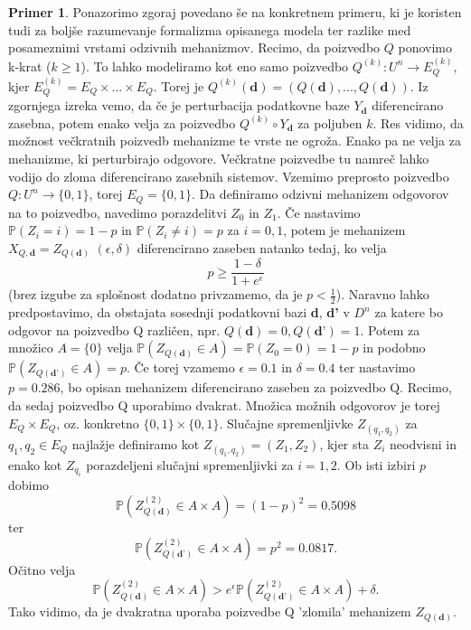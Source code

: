\documentclass[12pt,a4paper]{amsart}
\theoremstyle{definition} %
\newtheorem{primer}[definicija]{Primer}
\theoremstyle{plain} %
\begin{document}
\begin{primer}
Ponazorimo zgoraj povedano še na konkretnem primeru, ki je koristen tudi za boljše razumevanje formalizma opisanega modela ter razlike med posameznimi vrstami odzivnih mehanizmov. Recimo, da poizvedbo $Q$ ponovimo k-krat ($ k \geq 1$). To lahko modeliramo kot eno samo poizvedbo $Q^{(k)}: U^n \rightarrow E_{Q}^{(k)}$, kjer $E_{Q}^{(k)} = E_Q \times ... \times E_Q$. Torej je $Q^{(k)}(\textbf{d}) = (Q(\textbf{d}), ... , Q(\textbf{d}))$. Iz zgornjega izreka vemo, da če je perturbacija podatkovne baze $Y_{\textbf{d}}$ diferencirano zasebna, potem enako velja za poizvedbo $Q^{(k)} \circ Y_{\textbf{d}}$ za poljuben $k$. Res vidimo, da možnost večkratnih poizvedb mehanizme te vrste ne ogroža.
\newline
\newline
Enako pa ne velja za mehanizme, ki perturbirajo odgovore. Večkratne poizvedbe tu namreč lahko vodijo do zloma diferencirano zasebnih sistemov. Vzemimo preprosto poizvedbo $Q: U^n \rightarrow \{0,1\}$, torej $E_Q = \{0,1\}$. Da definiramo odzivni mehanizem odgovorov na to poizvedbo, navedimo porazdelitvi $Z_0$ in $Z_1$. Če nastavimo $\mathbb{P}(Z_i=i)=1-p$ in $\mathbb{P}(Z_i\neq i)=p$ za $i = 0,1$, potem je mehanizem $X_{Q,\textbf{d}} = Z_{Q(\textbf{d})}$ $(\epsilon, \delta)$ diferencirano zaseben natanko tedaj, ko velja $$p \geq \frac{1-\delta}{1+e^{\epsilon}}$$ (brez izgube za splošnost dodatno privzamemo, da je $p < \frac{1}{2}$).  Naravno lahko predpostavimo, da obstajata sosednji podatkovni bazi \textbf{d}, \textbf{d'} v $D^n$ za katere bo odgovor na poizvedbo Q različen, npr. $Q(\textbf{d})=0, Q(\textbf{d'})=1$. Potem za množico $A = \{0\}$ velja  $\mathbb{P}(Z_{Q(\textbf{d})} \in A) = \mathbb{P}(Z_0 = 0) = 1 - p$ in podobno $\mathbb{P}(Z_{Q(\textbf{d'})} \in A) =  p$. Če torej vzamemo $\epsilon = 0.1$ in $\delta = 0.4$ ter nastavimo $p = 0.286$, bo opisan mehanizem diferencirano zaseben za poizvedbo Q.
 \newline
\newline
Recimo, da sedaj poizvedbo Q uporabimo dvakrat. Množica možnih odgovorov je torej $E_Q \times E_Q$, oz. konkretno $\{0,1\} \times \{0,1\}$. Slučajne spremenljivke $Z_{(q_1, q_2)}$ za $q_1,q_2 \in E_Q$ najlažje definiramo kot $Z_{(q_1, q_2)} = (Z_1, Z_2)$, kjer sta $Z_i$ neodvisni in enako kot $Z_{q_i}$ porazdeljeni slučajni spremenljivki za $i = 1,2$. Ob isti izbiri $p$ dobimo $$\mathbb{P}(Z_{Q(\textbf{d})}^{(2)} \in A \times A) = (1-p)^2 = 0.5098$$ ter $$\mathbb{P}(Z_{Q(\textbf{d'})}^{(2)} \in A \times A) = p^2 = 0.0817.$$ Očitno velja $$\mathbb{P}(Z_{Q(\textbf{d})}^{(2)} \in A \times A) > e^{\epsilon}\mathbb{P}(Z_{Q(\textbf{d'})}^{(2)} \in A \times A) + \delta.$$ Tako vidimo, da je dvakratna uporaba poizvedbe Q 'zlomila' mehanizem $Z_{Q(\textbf{d})}$.
\end{primer}
\end{document}
